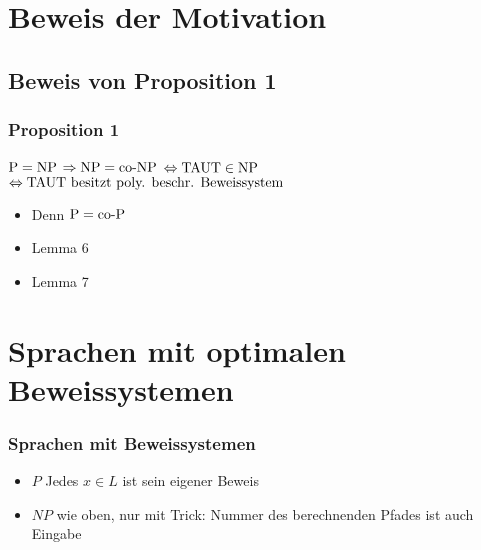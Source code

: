 \section{Beweis der Motivation} 
\subsection{Beweis von Proposition 1}

\begin{frame}
  \frametitle{Proposition 1}

  \begin{center}
   
    \(\text{P} = \text{NP}\)
     \(\Rightarrow \text{NP} = \text{co-NP}\)
     \(\Leftrightarrow \text{TAUT} \in \text{NP}\)
     \(\Leftrightarrow \text{TAUT} \text{ besitzt poly. beschr. Beweissystem}\)

  \end{center}
  
  \begin{itemize}
   \item<2> Denn \(\text{P} = \text{co-P}\)
   \item<3> Lemma 6
   \item<4> Lemma 7
  \end{itemize}
\end{frame}

\section{Sprachen mit optimalen Beweissystemen}

\begin{frame}
  \frametitle{Sprachen mit Beweissystemen}

  \begin{itemize}
    \item<2-> \(P\)  Jedes \(x \in L\) ist sein eigener Beweis
    \item<4-> \(NP\)  wie oben, nur mit Trick: Nummer des berechnenden Pfades ist auch Eingabe
  \end{itemize}
\end{frame}

